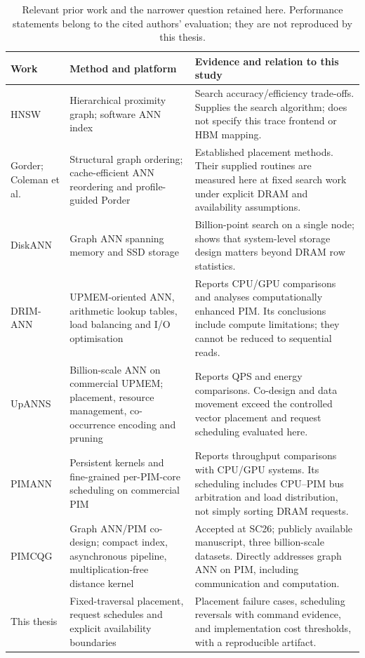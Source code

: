 \documentclass[11pt,a4paper]{report}
\begin{document}
\begin{table}[htbp]\centering\small
\caption[Position relative to prior work]{Relevant prior work and the narrower question retained here. Performance statements belong to the cited authors' evaluation; they are not reproduced by this thesis.}\label{tab:related}
\begin{tabular}{>{\raggedright\arraybackslash}p{}>{\raggedright\arraybackslash}p{}>{\raggedright\arraybackslash}p{}}
\toprule
Work & Method and platform & Evidence and relation to this study\\\midrule
HNSW \cite{hnsw} & Hierarchical proximity graph; software ANN index & Search accuracy/efficiency trade-offs. Supplies the search algorithm; does not specify this trace frontend or HBM mapping.\\
Gorder; Coleman et al.\ \cite{coleman,gorder} & Structural graph ordering; cache-efficient ANN reordering and profile-guided Porder & Established placement methods. Their supplied routines are measured here at fixed search work under explicit DRAM and availability assumptions.\\
DiskANN \cite{diskann} & Graph ANN spanning memory and SSD storage & Billion-point search on a single node; shows that system-level storage design matters beyond DRAM row statistics.\\
DRIM-ANN \cite{drim} & UPMEM-oriented ANN, arithmetic lookup tables, load balancing and I/O optimisation & Reports CPU/GPU comparisons and analyses computationally enhanced PIM. Its conclusions include compute limitations; they cannot be reduced to sequential reads.\\
UpANNS \cite{upanns} & Billion-scale ANN on commercial UPMEM; placement, resource management, co-occurrence encoding and pruning & Reports QPS and energy comparisons. Co-design and data movement exceed the controlled vector placement and request scheduling evaluated here.\\
PIMANN \cite{pimann} & Persistent kernels and fine-grained per-PIM-core scheduling on commercial PIM & Reports throughput comparisons with CPU/GPU systems. Its scheduling includes CPU--PIM bus arbitration and load distribution, not simply sorting DRAM requests.\\
PIMCQG \cite{pimcqg} & Graph ANN/PIM co-design; compact index, asynchronous pipeline, multiplication-free distance kernel & Accepted at SC26; publicly available manuscript, three billion-scale datasets. Directly addresses graph ANN on PIM, including communication and computation.\\
This thesis & Fixed-traversal placement, request schedules and explicit availability boundaries & Placement failure cases, scheduling reversals with command evidence, and implementation cost thresholds, with a reproducible artifact.\\\bottomrule
\end{tabular}
\end{table}
\end{document}
